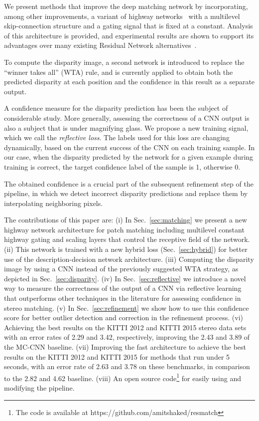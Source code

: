 \documentclass[10pt, twocolumn, letterpaper]{article}
\begin{document}
We present methods that improve the deep matching network by incorporating, among other improvements, a variant of highway networks~\cite{srivastava2015highway} with a multilevel skip-connection structure and a gating signal that is fixed at a constant. Analysis of this architecture is provided, and experimental results are shown to support its advantages over many existing Residual Network alternatives~\cite{residual,dense,resinres,srivastava2015highway}.

To compute the disparity image, a second network is introduced to replace the ``winner takes all'' (WTA) rule, and is currently applied to obtain both the predicted disparity at each position and the confidence in this result as a separate output.  

A confidence measure for the disparity prediction has been the subject of considerable study. More generally, assessing the correctness of a CNN output is also a subject that is under magnifying glass. We propose a new training signal, which we call the {\em reflective loss}. The labels used for this loss are changing dynamically, based on the current success of the CNN on each training sample. In our case, when the disparity predicted by the network for a given example during training is correct, the target confidence label of the sample is 1, otherwise 0. 

The obtained confidence is a crucial part of the subsequent refinement step of the pipeline, in which we detect incorrect disparity predictions and replace them by interpolating neighboring pixels. 

The contributions of this paper are:
(i) In Sec.~\ref{sec:matching} we present a new highway network architecture for patch matching including multilevel constant highway gating and scaling layers that control the receptive field of the network.
(ii) This network is trained with a new hybrid loss (Sec.~\ref{sec:hybrid}) for better use of the description-decision network architecture.
(iii) Computing the disparity image by using a CNN instead of the previously suggested WTA strategy, as depicted in Sec.~\ref{sec:disparity}.
(iv) In Sec.~\ref{sec:reflective} we introduce a novel way to measure the correctness of the output of a CNN via reflective learning that outperforms other techniques in the literature for assessing confidence in stereo matching.
(v) In Sec.~\ref{sec:refinement} we show how to use this confidence score for better outlier detection and correction in the refinement process.
(vi) Achieving the best results on the KITTI 2012 and KITTI 2015 stereo data sets with an error rates of 2.29 and 3.42, respectively, improving the 2.43 and 3.89 of the MC-CNN\cite{newlecun} baseline.
(vii) Improving the fast architecture to achieve the best results on the KITTI 2012 and KITTI 2015 for methods that run under 5 seconds, with an error rate of 2.63 and 3.78 on these benchmarks, in comparison to the 2.82 and 4.62 baseline.
(viii) An open source code\footnote{The code is available at https://github.com/amitshaked/resmatch} for easily using and modifying the pipeline. 
\end{document}
